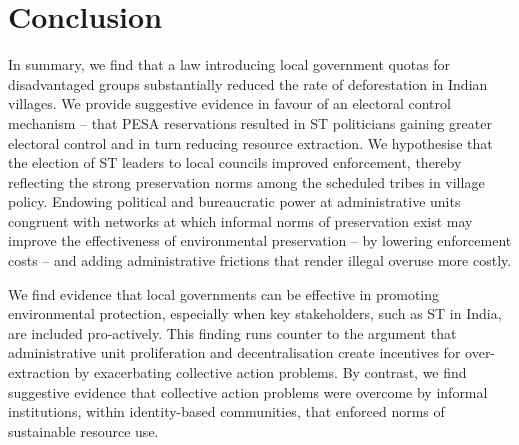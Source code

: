 \documentclass[12pt,reqno]{article}
\begin{document}
\pagebreak






\section{Conclusion} %
\label{sec:conclusion}

In summary, we find that a law introducing local government quotas for disadvantaged groups substantially reduced the rate of deforestation in Indian villages. We provide suggestive evidence in favour of an electoral control mechanism -- that PESA reservations resulted in ST politicians gaining greater electoral control and in turn reducing resource extraction. We hypothesise that the election of ST leaders to local councils improved enforcement, thereby reflecting the strong preservation norms among the scheduled tribes in village policy. Endowing political and bureaucratic power at administrative units congruent with networks at which informal norms of preservation exist may improve the effectiveness of environmental preservation -- by lowering enforcement costs -- and adding administrative frictions that render illegal overuse more costly.

We find evidence that local governments can be effective in promoting environmental protection, especially when key stakeholders, such as ST in India, are included pro-actively. This finding runs counter to the argument that administrative unit proliferation and decentralisation create incentives for over-extraction by exacerbating collective action problems. By contrast, we find suggestive evidence that collective action problems were overcome by informal institutions, within identity-based communities, that enforced norms of sustainable resource use.



\pagebreak


\printbibliography

\newpage
\renewcommand{\thetable}{A\arabic{table}}
\renewcommand{\thefigure}{A\arabic{figure}}
\setcounter{table}{0}
\setcounter{figure}{0}
\end{document}
